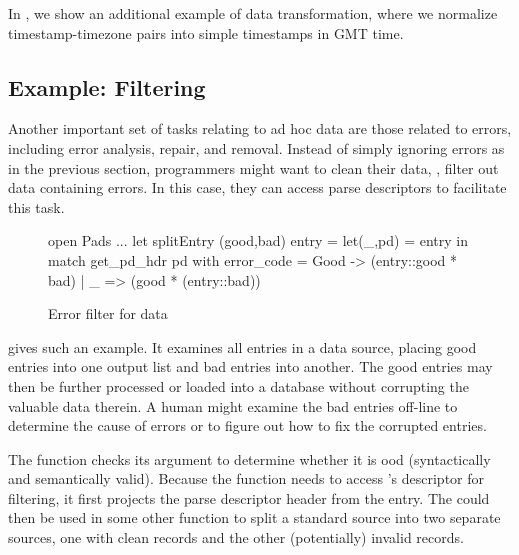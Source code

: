 In , we show an additional example of data
transformation, where we normalize timestamp-timezone pairs into
simple timestamps in GMT time.

\subsection{Example: Filtering}
\label{sec:ex-filter}

Another important set of tasks relating to ad hoc data are those
related to errors, including error analysis, repair, and removal.
Instead of simply ignoring errors as in the previous section,
programmers might want to clean their data, \ie{}, filter out data
containing errors. In this case, they can access parse descriptors to
facilitate this task.

\begin{figure}
\begin{code}\scriptsize
open Pads
   ...
let splitEntry (good,bad) entry =
  let(\_,pd) = entry in
    match get\_pd\_hdr pd with
      {error_code = Good} -> (entry::good * bad)
    | _ => (good * (entry::bad))\end{code}
\caption{Error filter for \dibbler{} data}
\label{fig:ex-data-clean}
\end{figure}

 gives such an example.  It examines all
entries in a \dibbler{} data source, placing good entries into one
output list and bad entries into another.  The good entries may then
be further processed or loaded into a database without corrupting the
valuable data therein.  A human might examine the bad entries off-line
to determine the cause of errors or to figure out how to fix the
corrupted entries.

The  function checks its argument  to
determine whether it is ood (syntactically and semantically
valid).  Because the function needs to access 's descriptor for
filtering, it first projects the parse descriptor header from the
entry.  The  could then be used in some other function
to split a standard \dibbler{} source into two separate sources, one
with clean records and the other (potentially) invalid records.


